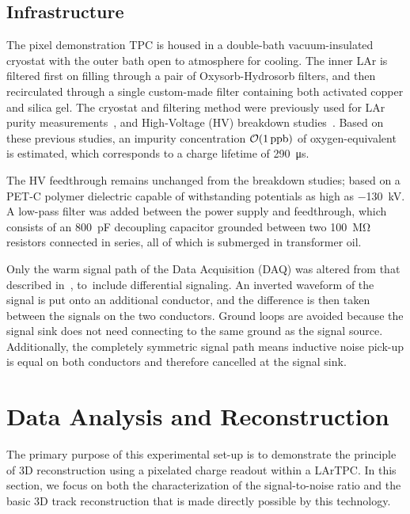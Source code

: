 \documentclass[instruments,article,accept,moreauthors,pdftex]{Definitions/mdpi}
\begin{document}
\subsection{Infrastructure}

The pixel demonstration TPC is housed in a double-bath vacuum-insulated cryostat with the outer bath open to atmosphere for cooling.
The inner LAr is filtered first on filling through a pair of Oxysorb-Hydrosorb filters, and then recirculated through a single custom-made filter containing both activated copper and silica gel.
The cryostat and filtering method were previously used for LAr purity measurements~\cite{purititty}, and High-Voltage (HV) breakdown studies~\cite{HVoriginal}.
Based on these previous studies, an impurity concentration $\order{\SI{1}{ppb}}$ of oxygen-equivalent is estimated, which corresponds to a charge lifetime of \SI{290}{\micro\second}.

The HV feedthrough remains unchanged from the breakdown studies; based on a PET-C polymer dielectric capable of withstanding potentials as high as \SI{-130}{\kilo\volt}.
A low-pass filter was added between the power supply and feedthrough, which consists of an \SI{800}{\pico\farad} decoupling capacitor grounded between two \SI{100}{\mega\ohm} resistors connected in series, all of which is submerged in transformer oil.  

Only the warm signal path of the Data Acquisition (DAQ) was altered from that described in~\cite{protoLASER}, to~include differential signaling.
An inverted waveform of the signal is put onto an additional conductor, and the difference is then taken between the signals on the two conductors.
Ground loops are avoided because the signal sink does not need connecting to the same ground as the signal source.
Additionally, the completely symmetric signal path means inductive noise pick-up is equal on both conductors and therefore cancelled at the signal sink.

\section{Data Analysis and Reconstruction} \label{sec:results}

The primary purpose of this experimental set-up is to demonstrate the principle of 3D reconstruction using a pixelated charge readout within a LArTPC. 
In this section, we focus on both the characterization of the signal-to-noise ratio and the basic 3D track reconstruction that is made directly possible by this technology.
\end{document}

